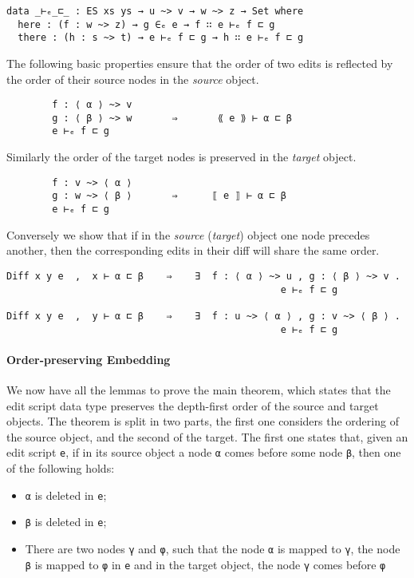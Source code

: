 \documentclass[preprint]{sigplanconf}
\begin{document}
\begin{verbatim}
data _⊢ₑ_⊏_ : ES xs ys → u ~> v → w ~> z → Set where
  here : (f : w ~> z) → g ∈ₑ e → f ∷ e ⊢ₑ f ⊏ g 
  there : (h : s ~> t) → e ⊢ₑ f ⊏ g → h ∷ e ⊢ₑ f ⊏ g 
\end{verbatim}

    The following basic properties ensure that the order of two edits 
    is reflected by the order of their source nodes in the \emph{source} object.
\begin{verbatim}
        f : ⟨ α ⟩ ~> v 
        g : ⟨ β ⟩ ~> w       ⇒       ⟪ e ⟫ ⊢ α ⊏ β
        e ⊢ₑ f ⊏ g 
\end{verbatim}
    Similarly the order of the target nodes is preserved in the \emph{target} 
    object.    

\begin{verbatim}
        f : v ~> ⟨ α ⟩
        g : w ~> ⟨ β ⟩       ⇒      ⟦ e ⟧ ⊢ α ⊏ β
        e ⊢ₑ f ⊏ g
\end{verbatim}

    Conversely we show that if in the \emph{source} (\emph{target}) 
    object one node precedes another, then the corresponding edits in their diff 
    will share the same order.
\begin{verbatim}
Diff x y e  ,  x ⊢ α ⊏ β    ⇒    ∃  f : ⟨ α ⟩ ~> u , g : ⟨ β ⟩ ~> v . 
                                                e ⊢ₑ f ⊏ g

Diff x y e  ,  y ⊢ α ⊏ β    ⇒    ∃  f : u ~> ⟨ α ⟩ , g : v ~> ⟨ β ⟩ . 
                                                e ⊢ₑ f ⊏ g
\end{verbatim}

    \paragraph{Order-preserving Embedding}
    We now have all the lemmas to prove the main theorem, 
    which states that the edit script data type preserves the depth-first order of
    the source and target objects.
    The theorem is split in two parts, the first one considers 
    the ordering of the source object, and the second of the target.
    The first one states that, given an edit script \texttt{e}, 
    if in its source object a node \texttt{α} comes before
    some node \texttt{β}, then one of the following holds:
    \begin{itemize}
    \item \texttt{α} is deleted in \texttt{e};
    \item \texttt{β} is deleted in \texttt{e};
    \item There are two nodes \texttt{γ} and \texttt{φ}, such that the node 
    \texttt{α} is 	mapped to \texttt{γ}, the node \texttt{β} is mapped to 
    \texttt{φ} in \texttt{e} and 
    in the target	object, the node \texttt{γ} comes before \texttt{φ}
    \end{itemize}
\end{document}
